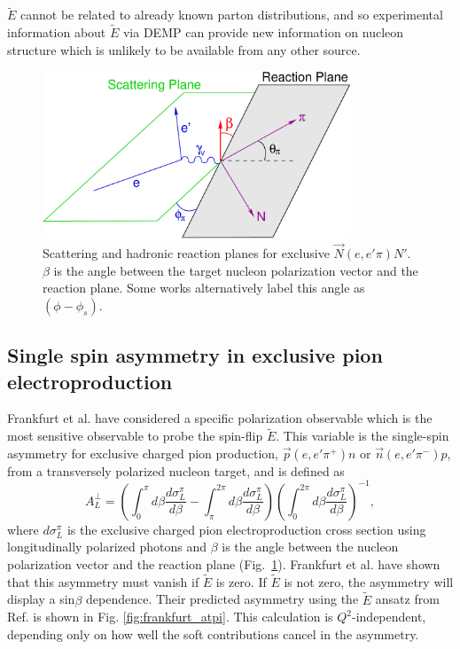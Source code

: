 $\tilde{E}$ cannot be related to already known parton distributions,
and so experimental information about $\tilde{E}$ via DEMP 
can provide new information on nucleon structure which is
unlikely to be available from any other source.

\begin{figure}[hbt!]
\begin{center}
\includegraphics[height=5cm]{./figures/atpi_planes.pdf}
\end{center}
\caption{\label{fig:planes}
Scattering and hadronic reaction planes for exclusive $\vec{N}(e,e'\pi)N'$.
$\beta$ is the angle between the target nucleon polarization vector and the
reaction plane.  Some works alternatively label this angle as $(\phi-\phi_s)$.
}
\end{figure}

\subsection{Single spin asymmetry in exclusive pion electroproduction}

Frankfurt et al. \cite{Fr99} have considered a specific polarization observable
which is the most sensitive observable to probe the spin-flip $\tilde{E}$.
This variable is the single-spin asymmetry for exclusive charged pion
production, $\vec{p}(e,e'\pi^+)n$ or $\vec{n}(e,e'\pi^-)p$, from a transversely
polarized nucleon target, and is defined \cite{Be01} as
\begin{equation} \label{eqn:asy}
A_L^{\perp}=(\int^{\pi}_0 d\beta \frac{d\sigma^{\pi}_L}{d\beta} -
\int^{2\pi}_{\pi} d\beta \frac{d\sigma^{\pi}_L}{d\beta})
(\int^{2\pi}_0 d\beta \frac{d\sigma^{\pi}_L}{d\beta})^{-1},
\end{equation}
where $d\sigma^{\pi}_L$ is the exclusive charged pion electroproduction cross
section using longitudinally polarized photons and $\beta$ is the angle between
the nucleon polarization vector and the reaction plane (Fig.~\ref{fig:planes}).  
Frankfurt et al. \cite{Fr99} have shown that this asymmetry must vanish if
$\tilde{E}$ is zero.  If $\tilde{E}$ is not zero, the asymmetry will display a
sin$\beta$ dependence.  Their predicted asymmetry using the $\tilde{E}$ ansatz
from Ref. \cite{Va99} is shown in Fig. \ref{fig:frankfurt_atpi}.  This
calculation is $Q^2$-independent, depending only on how well the soft
contributions cancel in the asymmetry.

